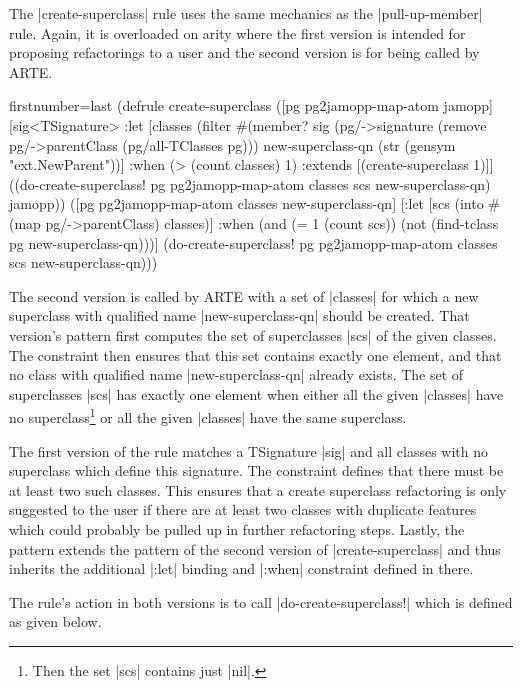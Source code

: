 \documentclass[submission]{eptcs}
\newcommand{\code}{\clojureinline}
\begin{document}
The \code|create-superclass| rule uses the same mechanics as the
\code|pull-up-member| rule.  Again, it is overloaded on arity where the first
version is intended for proposing refactorings to a user and the second version
is for being called by ARTE.

\begin{clojurecode*}{firstnumber=last}
(defrule create-superclass
  ([pg pg2jamopp-map-atom jamopp]
   [sig<TSignature>
    :let [classes (filter #(member? sig (pg/->signature %
                          (remove pg/->parentClass (pg/all-TClasses pg)))
          new-superclass-qn (str (gensym "ext.NewParent"))]
    :when (> (count classes) 1)
    :extends [(create-superclass 1)]]
   ((do-create-superclass! pg pg2jamopp-map-atom classes scs new-superclass-qn)
    jamopp))
  ([pg pg2jamopp-map-atom classes new-superclass-qn]
   [:let [scs (into #{} (map pg/->parentClass) classes)]
    :when (and (= 1 (count scs))
               (not (find-tclass pg new-superclass-qn)))]
   (do-create-superclass! pg pg2jamopp-map-atom classes scs new-superclass-qn)))
\end{clojurecode*}

The second version is called by ARTE with a set of \code|classes| for which a
new superclass with qualified name \code|new-superclass-qn| should be created.
That version's pattern first computes the set of superclasses \code|scs| of the
given classes.  The constraint then ensures that this set contains exactly one
element, and that no class with qualified name \code|new-superclass-qn| already
exists.  The set of superclasses \code|scs| has exactly one element when either
all the given \code|classes| have no superclass\footnote{Then the set
  \code|scs| contains just \code|nil|.} or all the given \code|classes| have
the same superclass.

The first version of the rule matches a \textsf{TSignature} \code|sig| and all
classes with no superclass which define this signature.  The constraint defines
that there must be at least two such classes.  This ensures that a create
superclass refactoring is only suggested to the user if there are at least two
classes with duplicate features which could probably be pulled up in further
refactoring steps.  Lastly, the pattern extends the pattern of the second
version of \code|create-superclass| and thus inherits the additional
\code|:let| binding and \code|:when| constraint defined in there.

The rule's action in both versions is to call \code|do-create-superclass!|
which is defined as given below.
\end{document}
